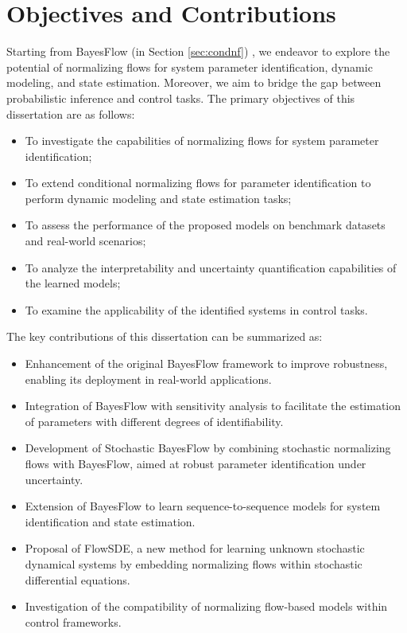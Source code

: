 \section{Objectives and Contributions}
\label{sec:introduction:objectives}
Starting from BayesFlow (in Section \ref{sec:condnf}) \citep{radev2020bayesflow}, we endeavor to explore the potential of normalizing flows for system parameter identification, dynamic modeling, and state estimation. Moreover, we aim to bridge the gap between probabilistic inference and control tasks. 
The primary objectives of this dissertation are as follows:
\begin{itemize}
    \item To investigate the capabilities of normalizing flows for system parameter identification;
    \item To extend conditional normalizing flows for parameter identification to perform dynamic modeling and state estimation tasks;
    \item To assess the performance of the proposed models on benchmark datasets and real-world scenarios;
    \item To analyze the interpretability and uncertainty quantification capabilities of the learned models;
    \item To examine the applicability of the identified systems in control tasks.
\end{itemize}
The key contributions of this dissertation can be summarized as:
\begin{itemize}
    \item Enhancement of the original BayesFlow framework to improve robustness, enabling its deployment in real-world applications.
    \item Integration of BayesFlow with sensitivity analysis to facilitate the estimation of parameters with different degrees of identifiability.
    \item Development of Stochastic BayesFlow by combining stochastic normalizing flows with BayesFlow, aimed at robust parameter identification under uncertainty.
    \item Extension of BayesFlow to learn sequence-to-sequence models for system identification and state estimation. 
    \item Proposal of FlowSDE, a new method for learning unknown stochastic dynamical systems by embedding normalizing flows within stochastic differential equations.
    \item Investigation of the compatibility of normalizing flow-based models within control frameworks.
\end{itemize}